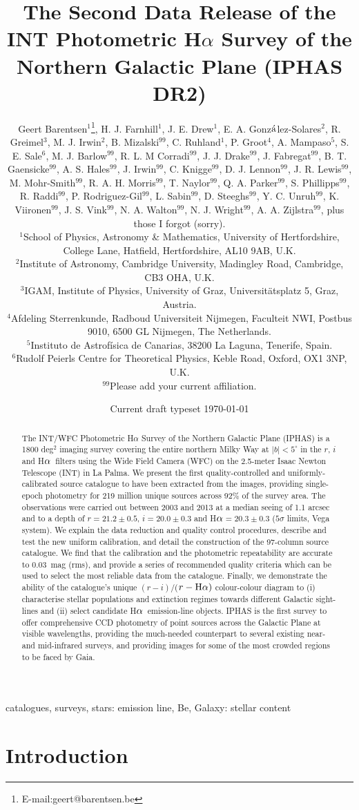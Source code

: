 \documentclass[useAMS,usenatbib]{mn2e}
\title[IPHAS Data Release 2]{The Second Data Release 
of the INT Photometric H$\alpha$ Survey 
of the Northern Galactic Plane (IPHAS DR2)}
\author[G. Barentsen
et. al]{Geert Barentsen$^{1}$\thanks{E-mail:geert@barentsen.be},
H. J. Farnhill$^1$,
J. E. Drew$^1$,
E. A. Gonz$\acute{\rm{a}}$lez-Solares$^2$, \newauthor
R. Greimel$^3$,
M. J. Irwin$^2$,
B. Mizalski$^{99}$,
C. Ruhland$^1$,
P. Groot$^4$,
A. Mampaso$^5$, \newauthor
S. E. Sale$^6$,
M. J. Barlow$^{99}$,
R. L. M Corradi$^{99}$,
J. J. Drake$^{99}$,
J. Fabregat$^{99}$, \newauthor
B. T. Gaensicke$^{99}$,
A. S. Hales$^{99}$,
J. Irwin$^{99}$,
C. Knigge$^{99}$,
D. J. Lennon$^{99}$, \newauthor
J. R. Lewis$^{99}$,
M. Mohr-Smith$^{99}$,
R. A. H. Morris$^{99}$,
T. Naylor$^{99}$,
Q. A. Parker$^{99}$, \newauthor
S. Phillipps$^{99}$,
R. Raddi$^{99}$,
P. Rodriguez-Gil$^{99}$,
L. Sabin$^{99}$,
D. Steeghs$^{99}$, \newauthor
Y. C. Unruh$^{99}$,
K. Viironen$^{99}$,
J. S. Vink$^{99}$,
N. A. Walton$^{99}$,
N. J. Wright$^{99}$, \newauthor
A. A. Zijlstra$^{99}$,
plus those I forgot (sorry).
\newauthor\\
$^{1}$School of Physics, Astronomy \& Mathematics, University of Hertfordshire, College Lane, Hatfield, Hertfordshire, AL10 9AB, U.K.\\
$^{2}$Institute of Astronomy, Cambridge University, Madingley Road, Cambridge, CB3 OHA, U.K.\\
$^{3}$IGAM, Institute of Physics, University of Graz, Universit\"atsplatz 5, Graz, Austria.\\
$^{4}$Afdeling Sterrenkunde, Radboud Universiteit Nijmegen, Faculteit NWI, Postbus 9010, 6500 GL Nijmegen, The Netherlands.\\
$^{5}$Instituto de Astrof\'isica de Canarias, 38200 La Laguna, Tenerife, Spain.\\
$^{6}$Rudolf Peierls Centre for Theoretical Physics, Keble Road, Oxford, OX1 3NP, U.K.\\
$^{99}$Please add your current affiliation.\\
}
\def\ha{\mbox{H$\rm \alpha$}}
\begin{document}
\date{Current draft typeset \today}
\pagerange{\pageref{firstpage}--\pageref{lastpage}} 

\maketitle

\label{firstpage}

\begin{abstract} %
The INT/WFC Photometric H$\alpha$ Survey 
of the Northern Galactic Plane (IPHAS)
is a 1800 deg$^2$ imaging survey
covering the entire northern Milky Way at $|b| < 5^\circ$
in the $r$, $i$ and \ha\ filters 
using the Wide Field Camera (WFC) 
on the 2.5-meter Isaac Newton Telescope (INT) in La Palma.
We present the first quality-controlled and
uniformly-calibrated source catalogue
to have been extracted from the images,
providing single-epoch photometry
for 219 million unique sources
across 92\% of the survey area.
The observations were carried out between 2003 and 2013
at a median seeing of 1.1 arcsec
and to a depth of $r=21.2\pm 0.5$, $i=20.0\pm 0.3$ and \ha$=20.3\pm 0.3$
($5\sigma$ limits, Vega system).
We explain the data reduction 
and quality control procedures,
describe and test the new uniform calibration,
and detail the construction of the 97-column source catalogue.
We find that the calibration
and the photometric repeatability are accurate to
0.03~mag (rms),
and provide a series of recommended quality criteria
which can be used to select the most reliable data
from the catalogue.
Finally, we demonstrate the ability of the 
catalogue's unique
$(r-i)$/($r-\ha)$ colour-colour diagram to
(i) characterise stellar populations and extinction regimes
towards different Galactic sight-lines
and (ii) select candidate \ha\ emission-line objects.
IPHAS is the first survey to offer comprehensive CCD photometry
of point sources across the Galactic Plane at visible wavelengths,
providing the much-needed counterpart
to several existing near- and mid-infrared surveys,
and providing images for some of the most
crowded regions to be faced by Gaia.
\end{abstract}

\begin{keywords}
catalogues, surveys, stars: emission line, Be, Galaxy: stellar content
\end{keywords}

\section{Introduction}
\end{document}
